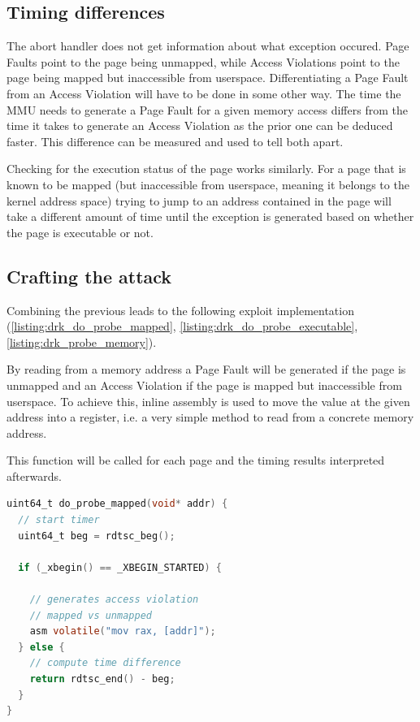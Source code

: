\subsection{Timing differences}

The abort handler does not get information about what exception occured.
Page Faults point to the page being unmapped, while Access Violations point to the page being mapped but inaccessible from userspace.
Differentiating a Page Fault from an Access Violation will have to be done in some other way.
The time the MMU needs to generate a Page Fault for a given memory access differs from the time it takes to generate an Access Violation as the prior one can be deduced faster.
This difference can be measured and used to tell both apart.\cite{drk}

Checking for the execution status of the page works similarly.
For a page that is known to be mapped (but inaccessible from userspace, meaning it belongs to the kernel address space) trying to jump to an address contained in the page will take a different amount of time until the exception is generated based on whether the page is executable or not.\cite{drk}

\subsection{Crafting the attack}

Combining the previous leads to the following exploit implementation (\autoref{listing:drk_do_probe_mapped}, \autoref{listing:drk_do_probe_executable}, \autoref{listing:drk_probe_memory}).

By reading from a memory address a Page Fault will be generated if the page is unmapped and an Access Violation if the page is mapped but inaccessible from userspace.
To achieve this, inline assembly is used to move the value at the given address into a register, i.e. a very simple method to read from a concrete memory address.

This function will be called for each page and the timing results interpreted afterwards.

\begin{lstlisting}[language=C, label=listing:drk_do_probe_mapped, caption={Mapped vs Unmapped timing test{\cite[Figure~3]{drk}}}]
uint64_t do_probe_mapped(void* addr) {
  // start timer
  uint64_t beg = rdtsc_beg();

  if (_xbegin() == _XBEGIN_STARTED) {

    // generates access violation
    // mapped vs unmapped
    asm volatile("mov rax, [addr]");
  } else {
    // compute time difference
    return rdtsc_end() - beg;
  }
}
\end{lstlisting}


